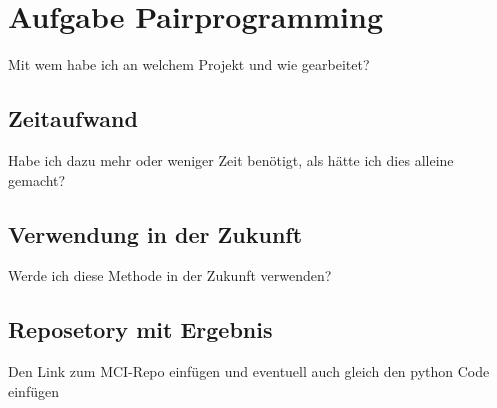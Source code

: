 \documentclass[12pt]{article}
\begin{document}
\tableofcontents
\pagebreak
\section{Aufgabe Pairprogramming}
Mit wem habe ich an welchem Projekt und wie gearbeitet?
\subsection{Zeitaufwand}
Habe ich dazu mehr oder weniger Zeit benötigt, als hätte ich dies alleine gemacht?
\subsection{Verwendung in der Zukunft}
Werde ich diese Methode in der Zukunft verwenden?
\subsection{Reposetory mit Ergebnis}
Den Link zum MCI-Repo einfügen und eventuell auch gleich den python Code einfügen
\end{document}
